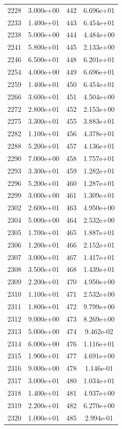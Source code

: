 \documentclass[12pt]{article}
\begin{document}
\begin{longtable}{@{}cccc@{}}
2228 & 3.000e+00 & 442 & 6.696e+01 \\
2233 & 1.400e+01 & 443 & 6.454e+01 \\
2238 & 5.000e+00 & 444 & 4.484e+00 \\
2241 & 5.800e+01 & 445 & 2.133e+00 \\
2246 & 6.500e+01 & 448 & 6.201e+01 \\
2254 & 4.000e+00 & 449 & 6.696e+01 \\
2259 & 1.400e+01 & 450 & 6.454e+01 \\
2266 & 3.600e+01 & 451 & 4.504e+00 \\
2272 & 2.800e+01 & 452 & 2.153e+00 \\
2275 & 3.300e+01 & 455 & 3.883e+01 \\
2282 & 1.100e+01 & 456 & 4.378e+01 \\
2288 & 5.200e+01 & 457 & 4.136e+01 \\
2290 & 7.000e+00 & 458 & 1.757e+01 \\
2293 & 3.300e+01 & 459 & 1.282e+01 \\
2296 & 5.200e+01 & 460 & 1.287e+01 \\
2299 & 3.000e+00 & 461 & 1.309e+01 \\
2302 & 2.600e+01 & 463 & 4.950e+00 \\
2304 & 5.000e+00 & 464 & 2.532e+00 \\
2305 & 1.700e+01 & 465 & 1.887e+01 \\
2306 & 1.200e+01 & 466 & 2.152e+01 \\
2307 & 3.000e+01 & 467 & 1.417e+01 \\
2308 & 3.500e+01 & 468 & 1.439e+01 \\
2309 & 2.200e+01 & 470 & 4.950e+00 \\
2310 & 1.100e+01 & 471 & 2.532e+00 \\
2311 & 1.800e+01 & 472 & 9.799e+00 \\
2312 & 9.000e+00 & 473 & 8.269e+00 \\
2313 & 5.000e+00 & 474 & 9.462e-02 \\
2314 & 6.000e+00 & 476 & 1.116e+01 \\
2315 & 1.900e+01 & 477 & 4.691e+00 \\
2316 & 9.000e+00 & 478 & 1.146e-01 \\
2317 & 3.000e+01 & 480 & 1.034e+01 \\
2318 & 1.400e+01 & 481 & 4.937e+00 \\
2319 & 2.200e+01 & 482 & 6.270e+00 \\
2320 & 1.000e+01 & 485 & 2.994e-01 \\

\end{longtable}
\end{document}
